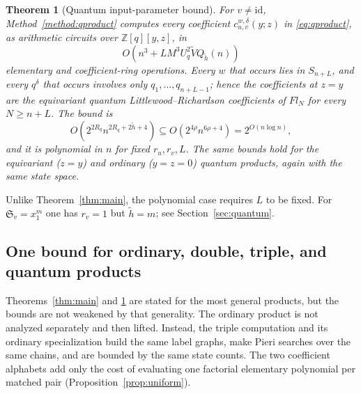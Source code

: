 \documentclass{amsart}
\newtheorem{theorem}{Theorem}[section]
\theoremstyle{definition}
\theoremstyle{remark}
\numberwithin{equation}{section}
\newcommand{\Sch}{\mathfrak S}
\newcommand{\id}{\mathrm{id}}
\begin{document}
\begin{theorem}[Quantum input-parameter bound]\label{thm:quantum}
For $v\neq\id$, Method~\ref{method:qproduct} computes every
coefficient $c_{u,v}^{w,\delta}(y;z)$ in \eqref{eq:qproduct}, as
arithmetic circuits over $\mathbb Z[q][y,z]$, in
\begin{equation}\label{eq:qmain}
 O\left(n^3+LM^3U_q^2\widetilde VQ_{\tilde h}(n)\right)
\end{equation}
elementary and coefficient-ring operations.
Every $w$ that occurs lies in $S_{n+L}$, and every $q^\delta$
that occurs involves only $q_1,\ldots,q_{n+L-1}$; hence the
coefficients at $z=y$ are the equivariant quantum
Littlewood--Richardson coefficients of $Fl_N$ for every $N\geq n+L$.
The bound is
\begin{equation}\label{eq:qcoarse}
 O\left(2^{2R_q}n^{2R_q+2\tilde h+4}\right)
 \subseteq O\left(2^{4\rho}n^{6\rho+4}\right)
 =2^{O(n\log n)},
\end{equation}
and it is polynomial in $n$ for fixed $r_u,r_v,L$.
The same bounds hold for the equivariant ($z=y$) and ordinary
($y=z=0$) quantum products, again with the same state space.
\end{theorem}

Unlike Theorem~\ref{thm:main}, the polynomial case requires $L$ to be
fixed. For $\Sch_v=x_1^m$ one has $r_v=1$ but $\tilde h=m$;
see Section~\ref{sec:quantum}.

\subsection{One bound for ordinary, double, triple, and quantum products}
\label{sec:uniform}

Theorems~\ref{thm:main} and \ref{thm:quantum} are stated for the most
general products, but the bounds are not weakened by that generality.
The ordinary product is not analyzed separately and then lifted.
Instead, the triple computation and its ordinary specialization build
the same label graphs, make Pieri searches over the same chains, and
are bounded by the same state counts.
The two coefficient alphabets add only the cost of evaluating one
factorial elementary polynomial per matched pair
(Proposition~\ref{prop:uniform}).
\end{document}
